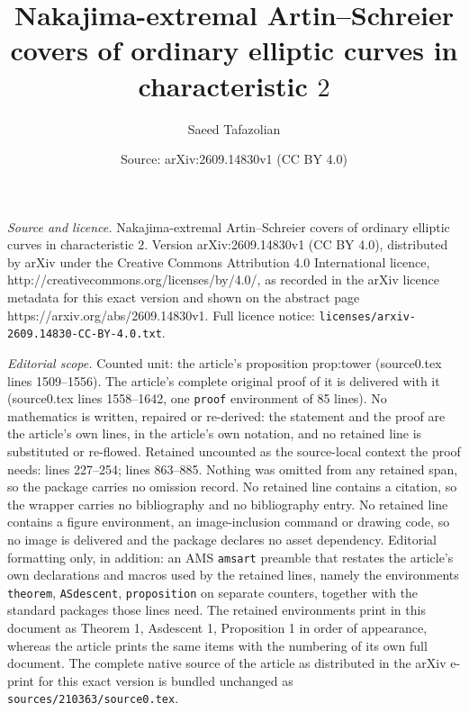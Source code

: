 \documentclass[10pt,a4paper]{amsart}
\title{Nakajima-extremal Artin--Schreier covers of ordinary elliptic curves in characteristic $2$}
\author{Saeed Tafazolian}
\date{Source: arXiv:2609.14830v1 (CC BY 4.0)}
\begin{document}
\maketitle

\noindent\emph{Source and licence.} Nakajima-extremal Artin--Schreier covers of ordinary elliptic curves in characteristic $2$. Version arXiv:2609.14830v1 (CC BY 4.0), distributed by arXiv under the Creative Commons Attribution 4.0 International licence, http://creativecommons.org/licenses/by/4.0/, as recorded in the arXiv licence metadata for this exact version and shown on the abstract page https://arxiv.org/abs/2609.14830v1. Full licence notice: \texttt{licenses/arxiv-2609.14830-CC-BY-4.0.txt}.\par\smallskip

\noindent\textit{Editorial scope.} Counted unit: the article's proposition prop:tower (source0.tex lines 1509--1556). The article's complete original proof of it is delivered with it (source0.tex lines 1558--1642, one \texttt{proof} environment of 85 lines). No mathematics is written, repaired or re-derived: the statement and the proof are the article's own lines, in the article's own notation, and no retained line is substituted or re-flowed.  Retained uncounted as the source-local context the proof needs: lines 227--254; lines 863--885.  Nothing was omitted from any retained span, so the package carries no omission record.  No retained line contains a citation, so the wrapper carries no bibliography and no bibliography entry.  No retained line contains a figure environment, an image-inclusion command or drawing code, so no image is delivered and the package declares no asset dependency.  Editorial formatting only, in addition: an AMS \texttt{amsart} preamble that restates the article's own declarations and macros used by the retained lines, namely the environments \texttt{theorem}, \texttt{ASdescent}, \texttt{proposition} on separate counters, together with the standard packages those lines need.  The retained environments print in this document as Theorem 1, Asdescent 1, Proposition 1 in order of appearance, whereas the article prints the same items with the numbering of its own full document.  The complete native source of the article as distributed in the arXiv e-print for this exact version is bundled unchanged as \texttt{sources/210363/source0.tex}.
\end{document}

